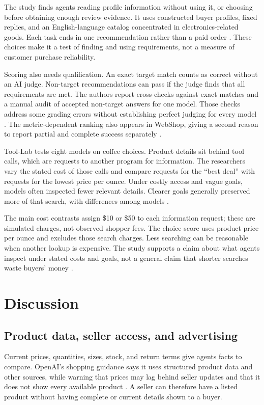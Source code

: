 \documentclass{article}
\begin{document}
The study finds agents reading profile information without using it, or choosing before obtaining enough review evidence. It uses constructed buyer profiles, fixed replies, and an English-language catalog concentrated in electronics-related goods. Each task ends in one recommendation rather than a paid order \cite{ref18}. These choices make it a test of finding and using requirements, not a measure of customer purchase reliability.

Scoring also needs qualification. An exact target match counts as correct without an AI judge. Non-target recommendations can pass if the judge finds that all requirements are met. The authors report cross-checks against exact matches and a manual audit of accepted non-target answers for one model. Those checks address some grading errors without establishing perfect judging for every model \cite{ref18}. The metric-dependent ranking also appears in WebShop, giving a second reason to report partial and complete success separately \cite{ref33}.

Tool-Lab tests eight models on coffee choices. Product details sit behind tool calls, which are requests to another program for information. The researchers vary the stated cost of those calls and compare requests for the ``best deal'' with requests for the lowest price per ounce. Under costly access and vague goals, models often inspected fewer relevant details. Clearer goals generally preserved more of that search, with differences among models \cite{ref19}.

The main cost contrasts assign \$10 or \$50 to each information request; these are simulated charges, not observed shopper fees. The choice score uses product price per ounce and excludes those search charges. Less searching can be reasonable when another lookup is expensive. The study supports a claim about what agents inspect under stated costs and goals, not a general claim that shorter searches waste buyers' money \cite{ref19}.

\section{Discussion}

\subsection{Product data, seller access, and advertising}

Current prices, quantities, sizes, stock, and return terms give agents facts to compare. OpenAI's shopping guidance says it uses structured product data and other sources, while warning that prices may lag behind seller updates and that it does not show every available product \cite{ref2}. A seller can therefore have a listed product without having complete or current details shown to a buyer.
\end{document}
